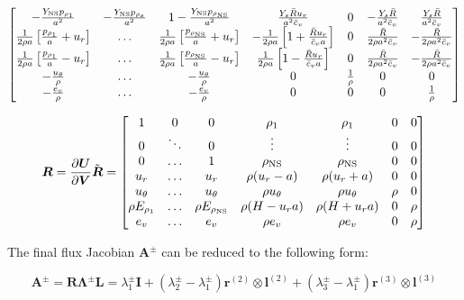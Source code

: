 \documentclass[10pt]{article}
\begin{document}
\begin{flushleft}
\begin{equation*}
\begin{bmatrix}
        - \frac{Y_\text{NS} p_{\rho_1}}{a^2} & - \frac{Y_\text{NS} p_{\rho_s}}{a^2} & 1 - \frac{Y_\text{NS} p_{\rho_\text{NS}}}{a^2} & \frac{Y_s \bar{R} u_r}{a^2 \bar{c}_v} & 0 & -\frac{Y_s \bar{R}}{a^2 \bar{c}_v} & \frac{Y_s \bar{R}}{a^2 \bar{c}_v} \\
        \frac{1}{2 \rho a} \left[ \frac{p_{\rho_1}}{a} + u_r \right] & \dots & \frac{1}{2 \rho a} \left[ \frac{p_{\rho_\text{NS}}}{a} + u_r \right] & -\frac{1}{2 \rho a} \left[ 1 + \frac{\bar{R} u_r}{\bar{c}_v a} \right] & 0 & \frac{\bar{R}}{2 \rho a^2 \bar{c}_v} & -\frac{\bar{R}}{2 \rho a^2 \bar{c}_v} \\
        \frac{1}{2 \rho a} \left[ \frac{p_{\rho_1}}{a} - u_r \right] & \dots & \frac{1}{2 \rho a} \left[ \frac{p_{\rho_\text{NS}}}{a} - u_r \right] & \frac{1}{2 \rho a} \left[ 1 - \frac{\bar{R} u_r}{\bar{c}_v a} \right] & 0 & \frac{\bar{R}}{2 \rho a^2 \bar{c}_v} & -\frac{\bar{R}}{2 \rho a^2 \bar{c}_v} \\
        - \frac{u_\theta}{\rho} & \dots & - \frac{u_\theta}{\rho} & 0 & \frac{1}{\rho} & 0 & 0 \\
        - \frac{e_v}{\rho} & \dots & - \frac{e_v}{\rho} & 0 & 0 & 0 & \frac{1}{\rho} \\
    \end{bmatrix}
\end{equation*}

\begin{equation*}
    \boldsymbol{R} = \frac{\partial \boldsymbol{U}}{\partial \boldsymbol{V}} \tilde{\boldsymbol{R}} = \begin{bmatrix}
        1 & 0 & 0 & \rho_1 & \rho_1 & 0 & 0 \\
        0 & \ddots & 0 & \vdots & \vdots & 0 & 0 \\
        0 & \dots & 1 & \rho_\text{NS} & \rho_\text{NS} & 0 & 0 \\
        u_r & \dots & u_r & \rho(u_r - a) & \rho(u_r + a) & 0 & 0  \\
        u_\theta & \dots & u_\theta & \rho u_\theta & \rho u_\theta & \rho & 0 \\
        \rho E_{\rho_1} & \dots & \rho E_{\rho_\text{NS}} & \rho(H - u_r a) & \rho(H + u_r a) & 0 & \rho \\
        e_v & \dots & e_v & \rho e_v & \rho e_v & 0 & \rho \\
    \end{bmatrix}
\end{equation*}

The final flux Jacobian $\boldsymbol{A}^\pm$ can be reduced to the following form:

\begin{equation}
\boldsymbol{A}^\pm = \boldsymbol{R} \boldsymbol{\Lambda}^\pm \boldsymbol{L} = \lambda_1^\pm \boldsymbol{I} + (\lambda_2^\pm - \lambda_1^\pm) \boldsymbol{r}^{(2)} \otimes \boldsymbol{l}^{(2)} + (\lambda_3^\pm - \lambda_1^\pm) \boldsymbol{r}^{(3)} \otimes  \boldsymbol{l}^{(3)}
\end{equation}


\end{flushleft}
\end{document}
